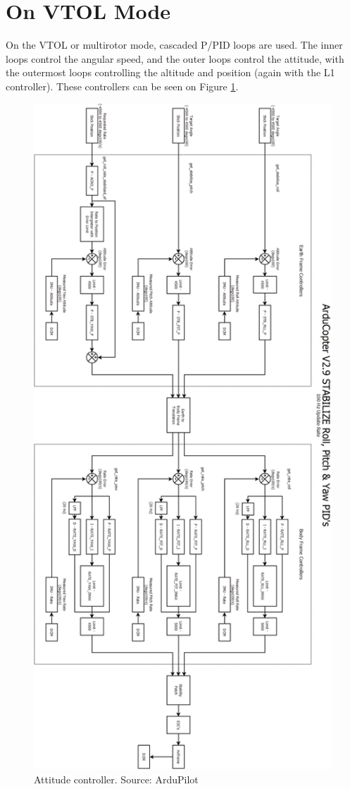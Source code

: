 \section{On VTOL Mode}
%
On the VTOL or multirotor mode, cascaded P/PID loops are used.
The inner loops control the angular speed, and the outer loops control the attitude, with the outermost loops controlling the altitude and position (again with the L1 controller). These controllers can be seen on Figure \ref{fig:copter_attitude_loops}.
\begin{figure}[H]
\centering
  \includegraphics[width=0.65\linewidth]{figs/copterpids.png}
  \caption{Attitude controller. Source: ArduPilot}
  \label{fig:copter_attitude_loops}
\end{figure}

